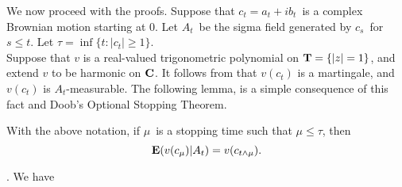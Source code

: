 We now proceed with the proofs.
Suppose that 
$c_t=a_t + i b_t$\ is a complex Brownian motion starting at $0$.  
Let $A_t$\ be the sigma field generated by $c_s$\ for $s \le t$.
Let
$\tau = \inf\{ t: |c_t| \ge 1\}$.\\
Suppose that $v$ is 
 a real-valued trigonometric polynomial on 
$\T=\{|z|=1\}$, and extend $v$ to be 
harmonic on $\C$.  It follows
from \cite[Theorem 4.1]{doob2} that $v(c_t)$
is a martingale, and $v(c_t)$ is $A_t$-measurable.
The following lemma, is a simple consequence of this fact and 
Doob's Optional Stopping Theorem.  
\begin{lemma5.1}
With the above notation, 
if $\mu$\ is a stopping time such that
$\mu \le \tau$, then
$$ \E( v(c_\mu) | A_t) = v(c_{t \wedge \mu}) .$$
\label{lemma5.1}
\end{lemma5.1}
%
%
%
%
%
%
%
%
%
%
%
%
\cite[Theorem (3.2), p.65]{ry}.  We have
%
%
%
